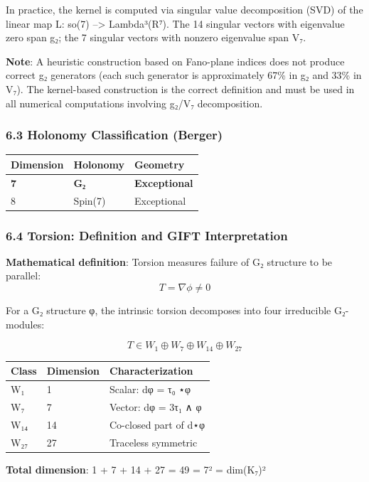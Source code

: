 \documentclass[11pt,a4paper]{article}
\begin{document}
{{{{{{{{{{In practice, the kernel is computed via singular value decomposition (SVD) of the linear map L: so(7) --\textgreater{} Lambda³(R⁷). The 14 singular vectors with eigenvalue zero span g₂; the 7 singular vectors with nonzero eigenvalue span V₇.

\textbf{Note}: A heuristic construction based on Fano-plane indices does not produce correct g₂ generators (each such generator is approximately 67\% in g₂ and 33\% in V₇). The kernel-based construction is the correct definition and must be used in all numerical computations involving g₂/V₇ decomposition.

\subsubsection{6.3 Holonomy Classification (Berger)}\label{holonomy-classification-berger}

{\def\LTcaptype{none} %
\begin{longtable}[]{@{}lll@{}}
\toprule\noalign{}
Dimension & Holonomy & Geometry \\
\midrule\noalign{}
\endhead
\bottomrule\noalign{}
\endlastfoot
\textbf{7} & \textbf{G₂} & \textbf{Exceptional} \\
8 & Spin(7) & Exceptional \\
\end{longtable}
\subsubsection{6.4 Torsion: Definition and GIFT Interpretation}\label{torsion-definition-and-gift-interpretation}

\textbf{Mathematical definition}: Torsion measures failure of G₂ structure to be parallel:
\[T = \nabla\phi \neq 0\]

For a G₂ structure φ, the intrinsic torsion decomposes into four irreducible G₂-modules:

\[T \in W_1 \oplus W_7 \oplus W_{14} \oplus W_{27}\]

{\def\LTcaptype{none} %
\begin{longtable}[]{@{}lll@{}}
\toprule\noalign{}
Class & Dimension & Characterization \\
\midrule\noalign{}
\endhead
\bottomrule\noalign{}
\endlastfoot
W₁ & 1 & Scalar: dφ = τ₀ ⋆φ \\
W₇ & 7 & Vector: dφ = 3τ₁ ∧ φ \\
W₁₄ & 14 & Co-closed part of d⋆φ \\
W₂₇ & 27 & Traceless symmetric \\
\end{longtable}
\textbf{Total dimension}: 1 + 7 + 14 + 27 = 49 = 7² = dim(K₇)²

}}}}}}}}}}}}
\end{document}
